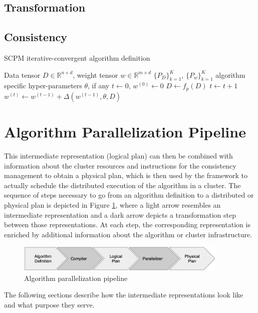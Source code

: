 \subsection{Transformation}

\subsection{Consistency}

\begin{algorithm}
\caption{SCPM iterative-convergent algorithm definition}\label{alg:scpm_ica}
\begin{algorithmic}[1]{}
\ALGSTATE Data tensor $D \in \mathbb{R}^{n \times d}$, weight tensor $w \in \mathbb{R}^{m \times d}$
\PARTITIONING $\{P_D\}_{k=1}^K$, $\{P_w\}_{k=1}^K$
\CONSISTENCY 
\INPUT algorithm specific hyper-parameters $\theta$, if any
\INIT $t \gets 0$, $w^{(0)} \gets 0$
\State $D \gets f_{p}(D)$
\Repeat
\State $t \gets t + 1$
\State $w^{(t)} \gets w^{(t-1)} + \Delta(w^{(t-1)}, \theta, D)$
\end{algorithmic}
\end{algorithm}


\section{Algorithm Parallelization Pipeline}
\label{s:algo_parallel_pipeline}
This intermediate representation (logical plan) can then be combined with information about the cluster resources and instructions for the consistency management to obtain a physical plan, which is then used by the framework to actually schedule the distributed execution of the algorithm in a cluster.
The sequence of steps necessary to go from an algorithm definition to a distributed or physical plan is depicted in Figure \ref{fig:parallel_pipeline}, where a light arrow resembles an intermediate representation and a dark arrow depicts a transformation step between those representations.
At each step, the corresponding representation is enriched by additional information about the algorithm or cluster infrastructure.
\begin{figure}[ht]
\centering
\includegraphics[width=0.9\textwidth]{img/algo_parallel_pipeline.png}
\caption{Algorithm parallelization pipeline}
\label{fig:parallel_pipeline}
\end{figure}
The following sections describe how the intermediate representations look like and what purpose they serve.

